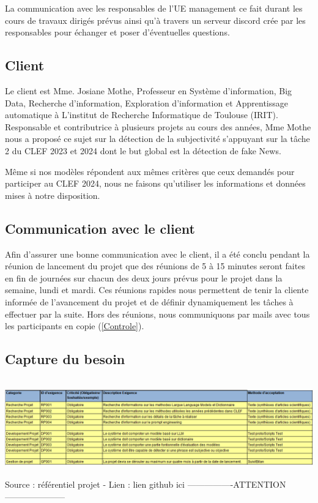 \documentclass[11pt]{rapport_class}
\begin{document}
La communication avec les responsables de l'UE management ce fait durant les cours de travaux dirigés prévus ainsi qu'à travers un serveur discord crée par les responsables pour échanger et poser d'éventuelles questions.


\subsection{Client}
\qquad Le client est Mme. Josiane Mothe, Professeur en Système d'information, Big Data, Recherche d'information, Exploration d'information et Apprentissage automatique à L'institut de Recherche Informatique de Toulouse (IRIT). Responsable et contributrice à plusieurs projets au cours des années, Mme Mothe nous a proposé ce sujet sur la détection de la subjectivité s'appuyant sur la tâche 2 du CLEF 2023 et 2024 dont le but global est la détection de fake News.

Même si nos modèles répondent aux mêmes critères que ceux demandés pour participer au CLEF 2024, nous ne faisons qu'utiliser les informations et données mises à notre disposition.

\subsection{Communication avec le client}
\qquad Afin d'assurer une bonne communication avec le client, il a été conclu pendant la réunion de lancement du projet que des réunions de 5 à 15 minutes seront faites en fin de journées sur chacun des deux jours prévus pour le projet dans la semaine, lundi et mardi. Ces réunions rapides nous permettent de tenir la cliente informée de l'avancement du projet et de définir dynamiquement les tâches à effectuer par la suite. Hors des réunions, nous communiquons par mails avec tous les participants en copie (\ref{Controle}). 


\subsection{Capture du besoin}
\begin{center}
\includegraphics[height=4.2cm]{capture_besoin.png}\\
\tiny
 Source : référentiel projet - Lien : lien github ici ----------------ATTENTION---------------------
\end{center}
\end{document}
